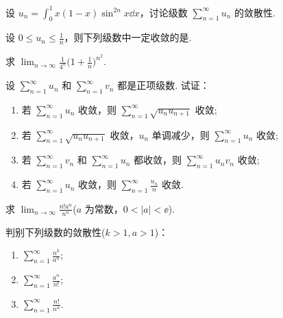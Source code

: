 	\begin{ti}
		设 $u_{n} = \int_{0}^{1} x (1 - x) \sin^{2n}x \dd{x}$，讨论级数 $\sum_{n=1}^{\infty} u_{n}$ 的敛散性.
	\end{ti}

	\begin{ti}
		设 $0 \leq u_{n} \leq \frac{1}{n}$，则下列级数中一定收敛的是\kuo.

	\end{ti}

	\begin{ti}
		求 $\lim_{n \to \infty} \frac{1}{4^{n}} \bigl( 1 + \frac{1}{n} \bigr)^{n^{2}}$.
	\end{ti}

	\begin{ti}
		设 $\sum_{n=1}^{\infty} u_{n}$ 和 $\sum_{n=1}^{\infty} v_{n}$ 都是正项级数. 试证：
		\begin{enumerate}
			\item 若 $\sum_{n=1}^{\infty} u_{n}$ 收敛，则 $\sum_{n=1}^{\infty} \sqrt{u_{n} u_{n+1}}$ 收敛;
			\item 若 $\sum_{n=1}^{\infty} \sqrt{u_{n} u_{n+1}}$ 收敛，$u_{n}$ 单调减少，则 $\sum_{n=1}^{\infty} u_{n}$ 收敛;
			\item 若 $\sum_{n=1}^{\infty} v_{n}$ 和 $\sum_{n=1}^{\infty} u_{n}$ 都收敛，则 $\sum_{n=1}^{\infty} u_{n} v_{n}$ 收敛;
			\item 若 $\sum_{n=1}^{\infty} u_{n}$ 收敛，则 $\sum_{n=1}^{\infty} \frac{u_{n}}{n}$ 收敛. 
		\end{enumerate}
	\end{ti}

	\begin{ti}
		求 $\lim_{n \to \infty} \frac{n! a^{n}}{n^{n}}$($a$ 为常数，$0 < |a| < \ee$).
	\end{ti}

	\begin{ti}
		判别下列级数的敛散性($k > 1, a > 1$)：
		\begin{enumerate}
			\item $\sum_{n=1}^{\infty} \frac{n^{k}}{a^{n}}$;
			\item $\sum_{n=1}^{\infty} \frac{a^{n}}{n!}$;
			\item $\sum_{n=1}^{\infty} \frac{n!}{n^{n}}$.
		\end{enumerate}
	\end{ti}

